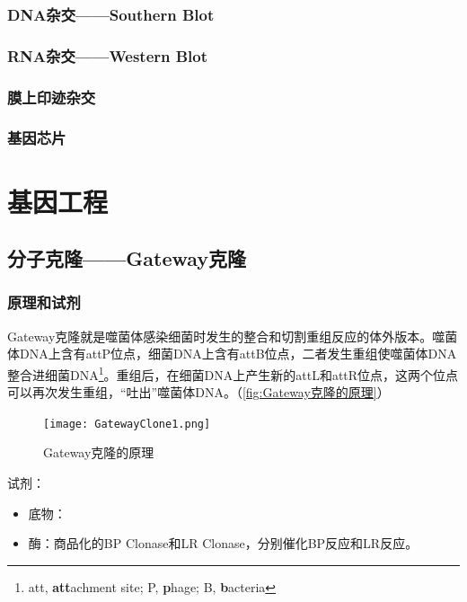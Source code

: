 \subsubsection{DNA杂交——Southern Blot}


\subsubsection{RNA杂交——Western Blot}

\subsubsection{膜上印迹杂交}

\subsubsection{基因芯片}

\section{基因工程}

\subsection{分子克隆——Gateway克隆}

\subsubsection{原理和试剂}

Gateway克隆就是噬菌体感染细菌时发生的整合和切割重组反应的体外版本。噬菌体DNA上含有attP位点，细菌DNA上含有attB位点，二者发生重组使噬菌体DNA整合进细菌DNA\footnote{att, \textbf{att}achment site; P, \textbf{p}hage; B, \textbf{b}acteria}。重组后，在细菌DNA上产生新的attL和attR位点，这两个位点可以再次发生重组，“吐出”噬菌体DNA。（\autoref{fig:Gateway克隆的原理}）

\begin{figure}[htbp]
	\centering
	\texttt{[image: GatewayClone1.png]}
	\caption{Gateway克隆的原理}
	\label{fig:Gateway克隆的原理}
\end{figure}

试剂：
\begin{itemize}
	\item 底物：
	\item 酶：商品化的BP Clonase和LR Clonase，分别催化BP反应和LR反应。
\end{itemize}

